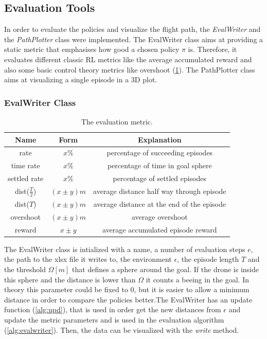 \newpage

\subsection{Evaluation Tools} \label{sec:tools}
In order to evaluate the policies and visualize the flight path, the \emph{EvalWriter} and the \emph{PathPlotter} class were implemented.
The EvalWriter class aims at providing a static metric that emphasises how good a chosen policy $\pi$ is. Therefore, it evaluates different classic RL metrics like the average accumulated reward and also some basic control theory metrics like overshoot (\cref{tab:evalmetric}).
The PathPlotter class aims at visualizing a single episode in a 3D plot.

\subsubsection{EvalWriter Class}
\begin{table}
	\centering
	\caption{The evaluation metric.}\label{tab:evalmetric}
	\begin{tabular}{c|c|c}
		Name & Form & Explanation\\
		\hline
		rate & $x \%$ & percentage of succeeding episodes\\
		time rate & $x\%$ & percentage of time in goal sphere\\
		settled rate & $x\%$ & percentage of settled episodes\\
		dist($\frac{T}{2}$) & $(x \pm y) m $& average distance half way through episode\\
		dist($T$) &  $(x \pm y) m $ & average distance at the end of the episode\\
		overshoot & $(x \pm y) m $ & average overshoot\\
		reward & $x \pm y $ & average accumulated episode reward
	\end{tabular}
\end{table}

The EvalWriter class is intialized with a name, a number of evaluation steps $e$, the path to the xlsx file it writes to, the environment $\epsilon$, the episode length  $T$ and the threshold $\Omega[m]$ that defines a sphere around the goal. If the drone is inside this sphere and the distance is lower than $\Omega$ it counts a beeing in the goal. In theory this parameter could be fixed to 0, but it is easier to allow a minimum distance in order to compare the policies better.The EvalWriter has  an update function (\cref{alg:upd}), that is used in order get the new distances from $\epsilon$ and update the metric parameters and is used in the evaluation algorithm (\cref{alg:evalwriter}). Then, the data can be visualized with the \emph{write} method.

